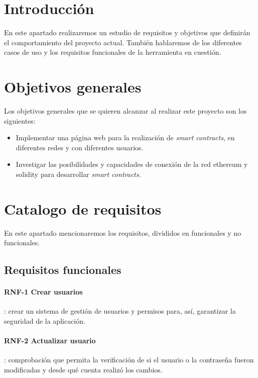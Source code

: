 
\section{Introducción}
En este apartado realizaremos un estudio de requisitos y objetivos que definirán el comportamiento del proyecto actual. También hablaremos de los diferentes casos de uso y los requisitos funcionales de la herramienta en cuestión.

\section{Objetivos generales}

Los objetivos generales que se quieren alcanzar al realizar este proyecto son los siguientes:
\begin{itemize}
	\item Implementar una página web para la realización de \textit{smart contracts}, en diferentes redes y con diferentes usuarios.
	\item Investigar las posibilidades y capacidades de conexión de la red ethereum y solidity para desarrollar \textit{smart contracts}.
\end{itemize}

\section{Catalogo de requisitos}

En este apartado mencionaremos los requisitos, divididos en funcionales y no funcionales.

\subsection{Requisitos funcionales}

\paragraph{RNF-1 Crear usuarios}: crear un sistema de gestión de usuarios y permisos para, así, garantizar la seguridad de la aplicación.

\paragraph{RNF-2 Actualizar usuario}: comprobación que permita la verificación de si el usuario o la contraseña fueron modificadas y desde qué cuenta realizó los cambios.

